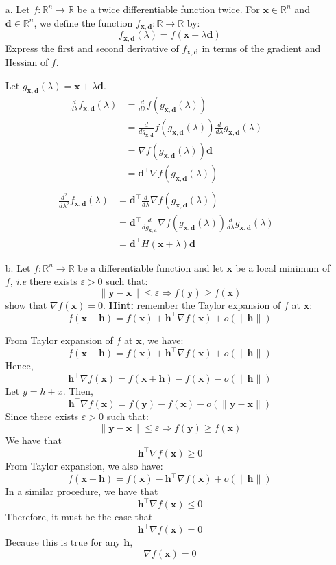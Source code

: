 \documentclass[11pt]{article}
\newcommand{\eps}{\varepsilon}
\newcommand{\R}{\mathbb{R}}                     %
\newcommand{\bx}{\mathbf{x}}
\newcommand{\bd}{\mathbf{d}}
\newcommand{\by}{\mathbf{y}}
\newcommand{\bh}{\mathbf{h}}
\begin{document}
\begin{itemize}
    \item[a.] Let $f:\R^n\to\R$ be a twice differentiable function twice. For
$\bx\in\R^n$ and $\bd\in\R^n$, we define the function $f_{\bx, \bd}:\R\to\R$ by:
\begin{displaymath}
    f_{\bx,\bd}(\lambda) = f(\bx+\lambda \bd)
\end{displaymath}
Express the first and second derivative of $f_{\bx,\bd}$ in terms of the
gradient and Hessian of $f$. 

\color{blue}
Let $g_{\bx,\bd}(\lambda) = \bx + \lambda \bd$.
\begin{align*}
\frac{d}{d\lambda}f_{\bx,\bd}(\lambda) &= \frac{d}{d\lambda}f(g_{\bx,\bd}(\lambda)) &\\
&=\frac{d}{dg_{\bx,\bd}}f(g_{\bx,\bd}(\lambda)) \frac{d}{d\lambda}g_{\bx,\bd}(\lambda) &\\
&= \nabla f(g_{\bx,\bd}(\lambda)) \bd &\\
&=\bd^\intercal  \nabla f(g_{\bx,\bd}(\lambda)) &\\
\end{align*}
\begin{align*}
\frac{d^2}{d\lambda^2} f_{\bx,\bd}(\lambda) &= \bd^\intercal  \frac{d}{d\lambda}  \nabla f(g_{\bx,\bd}(\lambda)) &\\
&= \bd^\intercal  \frac{d}{dg_{\bx,\bd}} \nabla f(g_{\bx,\bd}(\lambda)) \frac{d}{d\lambda} g_{\bx,\bd}(\lambda) &\\
&= \bd^\intercal  H(\bx+\lambda) \bd
\end{align*}
\color{black}


\item[b.] Let $f:\R^n\to\R$ be a differentiable function and let $\bx$ be
a local minimum of $f$, \emph{i.e} there exists $\eps>0$ such that:
\begin{displaymath}
    \|\by-\bx\| \leq \eps \Rightarrow f(\by) \geq f(\bx)
\end{displaymath}
show that $\nabla f(\bx) = 0$. \textbf{Hint:} remember the Taylor expansion of
$f$ at $\bx$:
\begin{displaymath}
    f(\bx+\bh) = f(\bx) + \bh^\intercal\nabla f(\bx) + o(\|\bh\|)
\end{displaymath}

\color{blue}
From Taylor expansion of $f$ at $\bx$, we have:
$$f(\bx+\bh) = f(\bx) + \bh^\intercal\nabla f(\bx) + o(\|\bh\|)$$
Hence,
$$\bh^\intercal\nabla f(\bx) = f(\bx+\bh) - f(\bx) - o(\|\bh\|)$$
Let $y=h+x$. Then,
$$\bh^\intercal\nabla f(\bx) = f(\by) - f(\bx) - o(\|\by-\bx\|)$$
Since there exists $\eps>0$ such that:
\begin{displaymath}
    \|\by-\bx\| \leq \eps \Rightarrow f(\by) \geq f(\bx)
\end{displaymath}
We have that 
$$\bh^\intercal\nabla f(\bx) \geq 0$$
From Taylor expansion, we also have:
$$f(\bx-\bh) = f(\bx) - \bh^\intercal\nabla f(\bx) + o(\|\bh\|)$$
In a similar procedure, we have that 
$$\bh^\intercal\nabla f(\bx) \leq 0$$
Therefore, it must be the case that 
$$\bh^\intercal\nabla f(\bx) = 0$$
Because this is true for any $\bh$, 
$$\nabla f(\bx) = 0$$
\color{black}



\end{itemize}
\end{document}

